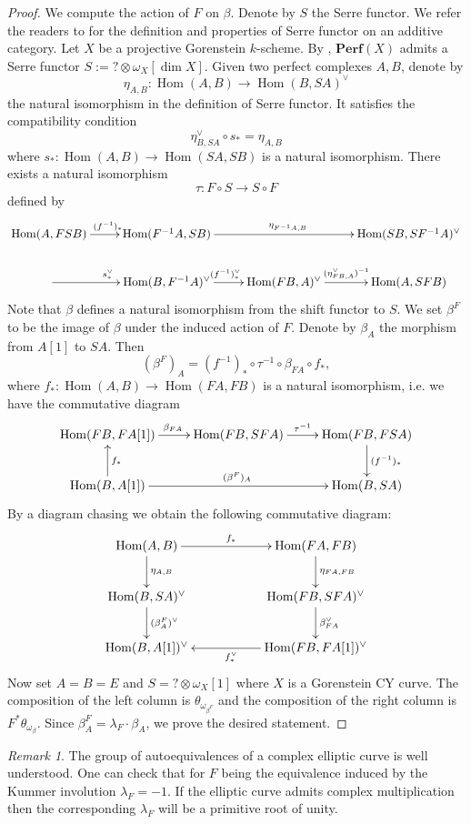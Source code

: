\documentclass[reqno]{amsart}
\theoremstyle{definition}
\theoremstyle{remark}
\newtheorem{remark}[theorem]{Remark}
\newcommand{\ot}{\otimes}
\newcommand{\Hom}{\operatorname{Hom}}
\newcommand{\perf}{\mathbf{Perf}}
\numberwithin{equation}{section}
\begin{document}
\begin{proof}
We compute the action of $F$ on $\beta$. Denote by $S$ the Serre functor. We refer the readers to \cite[Chapter 5]{Ballard09} for the definition and properties of Serre functor on an additive category. Let $X$ be a projective Gorenstein $k$-scheme.
By \cite[Lemma 6.6]{Ballard09}, $\perf(X)$ admits a Serre functor $S:=?\ot \omega_X[\dim X]$. 
Given two perfect complexes $A,B$, denote by
\[
\eta_{A,B}: \Hom(A,B)\to \Hom(B,SA)^\vee
\] the natural isomorphism in the definition of Serre functor. It satisfies the compatibility condition 
\[
\eta_{B,SA}^\vee\circ s_*=\eta_{A,B}
\] where $s_*: \Hom(A,B)\to\Hom(SA,SB)$ is a natural isomorphism.
There exists a natural isomorphism 
\[
\tau: F\circ S\to S\circ F
\] defined by
\[\xymatrix{
\Hom(A,FSB)\ar[r]^{(f^{-1})_*} & \Hom(F^{-1}A,SB)\ar[rr]^{\eta_{F^{-1}A,B}} & &\Hom(SB,SF^{-1}A)^\vee\\
\ar[r]^{s_*^\vee} & \Hom(B,F^{-1}A)^\vee\ar[r]^{(f^{-1})_*^\vee} &\Hom(FB,A)^\vee\ar[r]^{(\eta_{FB,A}^\vee)^{-1}} & \Hom(A,SFB)
}
\]
Note that $\beta$ defines a natural isomorphism from the shift functor to $S$. We set $\beta^F$ to be the image of $\beta$ under the induced action of $F$. Denote by $\beta_A$ the morphism from $A[1]$ to $SA$. Then
\[
(\beta^F)_A=(f^{-1})_*\circ \tau^{-1}\circ \beta_{FA}\circ f_*,
\] where $f_*: \Hom(A,B)\to\Hom(FA,FB)$ is a natural isomorphism, i.e. we have the commutative diagram
\[
\xymatrix{
\Hom(FB,FA[1])\ar[r]^{\beta_{FA}} & \Hom(FB,SFA)\ar[r]^{\tau^{-1}} & \Hom(FB,FSA)\ar[d]^{(f^{-1})_*}\\
\Hom(B,A[1])\ar[u]_{f_*}\ar[rr]^{(\beta^F)_A} &  &\Hom(B,SA)
}
\]
By a diagram chasing we obtain the following commutative diagram: 
\[\xymatrix{
\Hom(A,B)\ar[rr]^{f_*}\ar[d]^{\eta_{A,B}} && \Hom(FA,FB)\ar[d]^{\eta_{FA,FB}}\\
\Hom(B,SA)^\vee \ar[d]^{(\beta^F_A)^\vee} & & \Hom(FB,SFA)^\vee\ar[d]^{\beta_{FA}^\vee}\\
\Hom(B,A[1])^\vee & & \Hom(FB,FA[1])^\vee\ar[ll]^{f_*^\vee}
}
\]
Now set $A=B=E$ and $S=?\ot \omega_X[1]$ where $X$ is a Gorenstein CY curve. The composition of the left column is $\theta_{\omega_{\beta^F}}$ and the composition of the right column is $F^*\theta_{\omega_\beta}$. Since $\beta^F_A=\lambda_F\cdot \beta_A$, we prove the desired statement.
\end{proof}

\begin{remark}
The group of autoequivalences of a complex elliptic curve is well understood. One can check that for $F$ being the equivalence induced by the Kummer involution $\lambda_F=-1$. If the elliptic curve admits complex multiplication then the corresponding $\lambda_F$ will be a primitive root of unity.
\end{remark}
\end{document}
